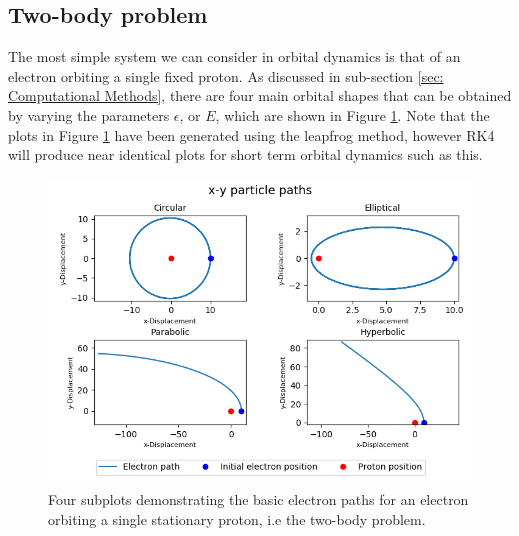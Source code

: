 \documentclass[12pt]{article} %
\numberwithin{equation}{subsection} %
\begin{document}
\subsection{Two-body problem} \label{subsec: two-body}
The most simple system we can consider in orbital dynamics is that of an electron orbiting a single fixed proton. As discussed in sub-section \ref{sec: Computational Methods}, there are four main orbital shapes that can be obtained by varying the parameters $\epsilon$, or $E$, which are shown in Figure \ref{fig: combined plots}. Note that the plots in Figure \ref{fig: combined plots} have been generated using the leapfrog method, however RK4 will produce near identical plots for short term orbital dynamics such as this. \par
\begin{figure}[h]
    \centering
    \captionsetup{justification=centering}
	\includegraphics[scale=0.45]{images/combinedPlot3.png}
	\caption{Four subplots demonstrating the basic electron paths for an electron orbiting a single stationary proton, i.e the two-body problem.}
	\label{fig: combined plots}
	\end{figure}
	
\end{document}
